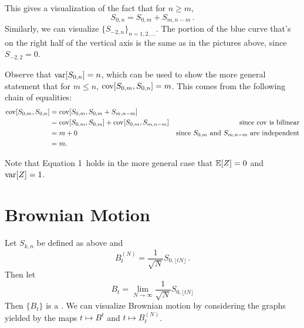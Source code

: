 \documentclass[../../../Master/AppliedStochastics.tex]{subfiles}
\begin{document}
This gives a visualization of the fact that for $n\geq m$,
\begin{equation*}
    S_{0, n} = S_{0, m} + S_{m, n-m}\,.
\end{equation*}
Similarly, we can visualize $\{S_{-2, n}\}_{n=1, 2, \ldots}$.
The portion of the blue curve that's on the right half
    of the vertical axis is the same as in the pictures above,
    since $S_{-2, 2}=0$.


Observe that $\operatorname{var}[S_{0, n}] = n$,
    which can be used to show the more general statement that for $m \leq n$,
    $\operatorname{cov}[S_{0, m}, S_{0, n}] = m$.
This comes from the following chain of equalities:
\begin{align*}
\operatorname{cov}[S_{0, m},S_{0, n}] &= \operatorname{cov}[S_{0, m},S_{0, m} + S_{m, n-m}]\\
                        &= \operatorname{cov}[S_{0, m}, S_{0, m}] + \operatorname{cov}[S_{0, m}, S_{m, n-m}]
                            &\text{since $\operatorname{cov}$ is bilinear}\\
                        &= m + 0 
                            &\text{since $S_{0, m}$ and $S_{m, n-m}$
                                    are independent}\\
                        &= m.
\end{align*}


Note that Equation 1\addref\ holds in the more general case that
    $\mathbb{E}[Z]=0$ and $\operatorname{var}[Z] = 1$.


\section{Brownian Motion}


Let $S_{k, n}$ be defined as above and
\begin{equation*} 
    B_t^{(N)} = \frac{1}{\sqrt{N}} S_{0, \lfloor t N\rfloor}\,.
\end{equation*}
Then let
\begin{equation*}
    B_t = \lim_{N \to \infty} \frac{1}{\sqrt{N}} S_{0, \lfloor t N\rfloor}
\end{equation*}
Then $\{B_t\}$ is a .
We can visualize Brownian motion by considering the graphs
    yielded by the maps $t \mapsto B^t$ and $t\mapsto B_t^{(N)}$.
\end{document}
